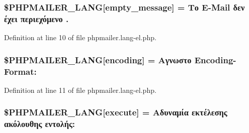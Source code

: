 \subsubsection[{\texorpdfstring{\$\+P\+H\+P\+M\+A\+I\+L\+E\+R\+\_\+\+L\+A\+NG}{$PHPMAILER_LANG}}]{\setlength{\rightskip}{0pt plus 5cm}\$P\+H\+P\+M\+A\+I\+L\+E\+R\+\_\+\+L\+A\+NG\mbox{[}\textquotesingle{}empty\+\_\+message\textquotesingle{}\mbox{]} = \textquotesingle{}Το E-\/Mail δεν έχει περιεχόμενο .\textquotesingle{}}\hypertarget{phpmailer_8lang-el_8php_a33772099f637c9d6c2cd7425e0e37fed}{}\label{phpmailer_8lang-el_8php_a33772099f637c9d6c2cd7425e0e37fed}


Definition at line 10 of file phpmailer.\+lang-\/el.\+php.

\subsubsection[{\texorpdfstring{\$\+P\+H\+P\+M\+A\+I\+L\+E\+R\+\_\+\+L\+A\+NG}{$PHPMAILER_LANG}}]{\setlength{\rightskip}{0pt plus 5cm}\$P\+H\+P\+M\+A\+I\+L\+E\+R\+\_\+\+L\+A\+NG\mbox{[}\textquotesingle{}encoding\textquotesingle{}\mbox{]} = \textquotesingle{}Αγνωστο Encoding-\/Format\+: \textquotesingle{}}\hypertarget{phpmailer_8lang-el_8php_a817f7283f3d54c970a0c10305cc668cc}{}\label{phpmailer_8lang-el_8php_a817f7283f3d54c970a0c10305cc668cc}


Definition at line 11 of file phpmailer.\+lang-\/el.\+php.

\subsubsection[{\texorpdfstring{\$\+P\+H\+P\+M\+A\+I\+L\+E\+R\+\_\+\+L\+A\+NG}{$PHPMAILER_LANG}}]{\setlength{\rightskip}{0pt plus 5cm}\$P\+H\+P\+M\+A\+I\+L\+E\+R\+\_\+\+L\+A\+NG\mbox{[}\textquotesingle{}execute\textquotesingle{}\mbox{]} = \textquotesingle{}Αδυναμία εκτέλεσης ακόλουθης εντολής\+: \textquotesingle{}}\hypertarget{phpmailer_8lang-el_8php_a668217a9563a168f30f2a8548b6ed5a9}{}\label{phpmailer_8lang-el_8php_a668217a9563a168f30f2a8548b6ed5a9}


